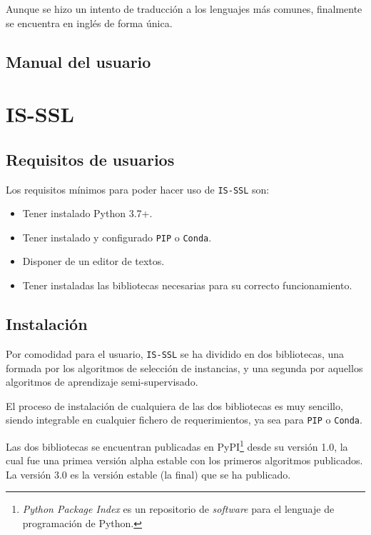 Aunque se hizo un intento de traducción a los lenguajes más comunes, finalmente se encuentra en inglés de forma única.

\subsection{Manual del usuario}



\section{IS-SSL}
\subsection{Requisitos de usuarios}
Los requisitos mínimos para poder hacer uso de \texttt{IS-SSL} son:
\begin{itemize}
\item Tener instalado Python 3.7+.
\item Tener instalado y configurado \texttt{PIP} o \texttt{Conda}.
\item Disponer de un editor de textos.
\item Tener instaladas las bibliotecas necesarias para su correcto funcionamiento.
\end{itemize}

\subsection{Instalación}

Por comodidad para el usuario, \texttt{IS-SSL} se ha dividido en dos bibliotecas, una formada por los algoritmos de selección de instancias, y una segunda por aquellos algoritmos de aprendizaje semi-supervisado.

El proceso de instalación de cualquiera de las dos bibliotecas es muy sencillo, siendo integrable en cualquier fichero de requerimientos, ya sea para \texttt{PIP} o \texttt{Conda}.

Las dos bibliotecas se encuentran publicadas en PyPI\footnote{\textit{Python Package Index} es un repositorio de \textit{software} para el lenguaje de programación de Python.} desde su versión 1.0, la cual fue una primea versión alpha estable con los primeros algoritmos publicados. 
La versión 3.0 es la versión estable (la final) que se ha publicado.


